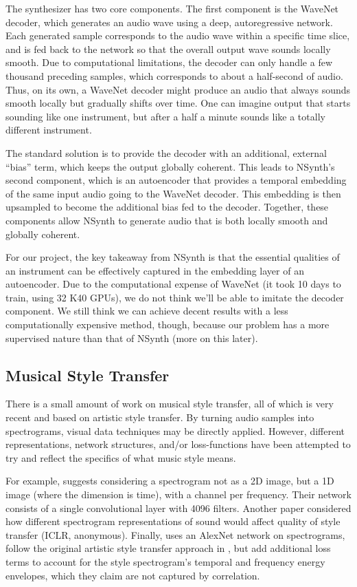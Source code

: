 \documentclass{article}
\begin{document}
The synthesizer has two core components.
The first component is the WaveNet decoder, which generates an audio wave using a deep, autoregressive network\cite{oord2016wavenet}.
Each generated sample corresponds to the audio wave within a specific time slice, and is fed back to the network so that the overall output wave sounds locally smooth.
Due to computational limitations, the decoder can only handle a few thousand preceding samples, which corresponds to about a half-second of audio.
Thus, on its own, a WaveNet decoder might produce an audio that always sounds smooth locally but gradually shifts over time.
One can imagine output that starts sounding like one instrument, but after a half a minute sounds like a totally different instrument.

The standard solution is to provide the decoder with an additional, external ``bias'' term, which keeps the output globally coherent.
This leads to NSynth's second component, which is an autoencoder that provides a temporal embedding of the same input audio going to the WaveNet decoder.
This embedding is then upsampled to become the additional bias fed to the decoder.
Together, these components allow NSynth to generate audio that is both locally smooth and globally coherent.

For our project, the key takeaway from NSynth is that the essential qualities of an instrument can be effectively captured in the embedding layer of an autoencoder.
Due to the computational expense of WaveNet (it took 10 days to train, using 32 K40 GPUs), we do not think we'll be able to imitate the decoder component.
We still think we can achieve decent results with a less computationally expensive method, though, because our problem has a more supervised nature than that of NSynth (more on this later).

\subsection{Musical Style Transfer}
There is a small amount of work on musical style transfer, all of which is very recent and based on artistic style transfer.
By turning audio samples into spectrograms, visual data techniques may be directly applied.
However, different representations, network structures, and/or loss-functions have been attempted to try and reflect the specifics of what music style means.

For example, \cite{ulyanov} suggests considering a spectrogram not as a 2D image, but a 1D image (where the dimension is time), with a channel per frequency.
Their network consists of a single convolutional layer with 4096 filters.
Another paper considered how different spectrogram representations of sound would affect quality of style transfer (ICLR, anonymous).
Finally, \cite{vs18} uses an AlexNet network on spectrograms, follow the original artistic style transfer approach in \cite{gea15}, but add additional loss terms to account for the style spectrogram's temporal and frequency energy envelopes, which they claim are not captured by correlation.
\end{document}
